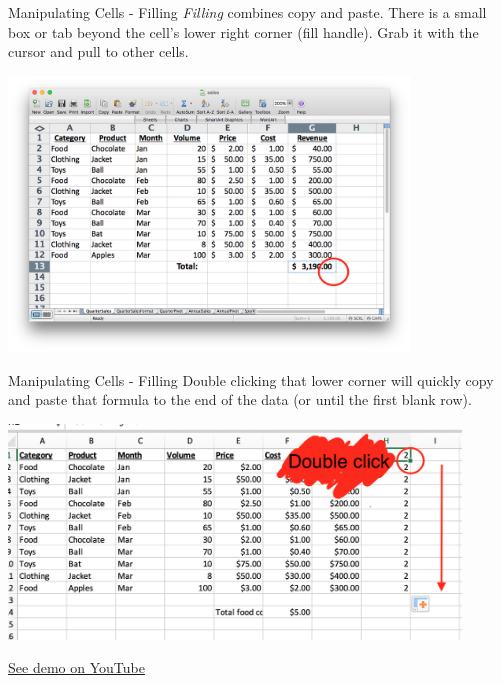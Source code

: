 \documentclass[xcolor=svgnames]{beamer}
\begin{document}
\begin{frame}{Manipulating Cells - Filling}
\emph{Filling} combines copy and paste.  There is a small box or tab beyond the cell's lower right corner (fill handle).  Grab it with the cursor and pull to other cells. \\
\begin{center}
 \includegraphics[width=0.8\textwidth]{Filling}
\end{center}
\end{frame}


\begin{frame}{Manipulating Cells - Filling}
 Double clicking that lower corner will quickly copy and paste that formula to the end of the data (or until the first blank row).
\begin{center}
 \includegraphics[width=0.9\textwidth]{doubleClick}
\end{center}                                         
\href{https://youtu.be/O8c9N6CIqWM}{See demo on YouTube}
\end{frame}
\end{document}
